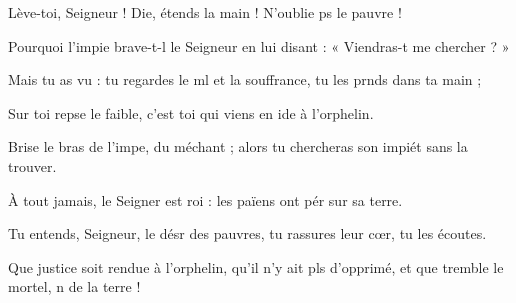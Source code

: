 \item Lève-toi, Seigneur ! Die, étends la main !\psstar{} N’oublie ps le pauvre !
\item Pourquoi l’impie brave-t-l le Seigneur\psstar{} en lui disant : « Viendras-t me chercher ? »
\item Mais tu as vu : tu regardes le ml et la souffrance,\psstar{} tu les prnds dans ta main ;
\item Sur toi repse le faible,\psstar{} c’est toi qui viens en ide à l’orphelin.
\item Brise le bras de l’impe, du méchant ;\psstar{} alors tu chercheras son impiét sans la trouver.
\item À tout jamais, le Seigner est roi :\psstar{} les païens ont pér sur sa terre.
\item Tu entends, Seigneur, le désr des pauvres,\psstar{} tu rassures leur cœr, tu les écoutes.
\item Que justice soit rendue à l’orphelin, qu’il n’y ait pls d’opprimé,\psstar{} et que tremble le mortel, n de la terre !